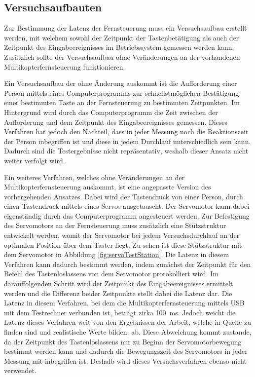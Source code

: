\subsection{Versuchsaufbauten}
Zur Bestimmung der Latenz der Fernsteuerung muss ein Versuchsaufbau erstellt werden, mit welchem sowohl der Zeitpunkt der Tastenbetätigung als auch der Zeitpunkt des Eingabeereignisses im Betriebssystem gemessen werden kann. Zusätzlich sollte der Versuchsaufbau ohne Veränderungen an der vorhandenen Multikopterfernsteuerung funktionieren.

Ein Versuchsaufbau der ohne Änderung auskommt ist die Aufforderung einer Person mittels eines Computerprogramms zur schnellstmöglichen Bestätigung einer bestimmten Taste an der Fernsteuerung zu bestimmten Zeitpunkten. Im Hintergrund wird durch das Computerprogramm die Zeit zwischen der Aufforderung und dem Zeitpunkt des Eingabeereignisses gemessen. Dieses Verfahren hat jedoch den Nachteil, dass in jeder Messung noch die Reaktionszeit der Person inbegriffen ist und diese in jedem Durchlauf unterschiedlich sein kann. Dadurch sind die Testergebnisse nicht repräsentativ, weshalb dieser Ansatz nicht weiter verfolgt wird.

Ein weiteres Verfahren, welches ohne Veränderungen an der Multikopterfernsteuerung auskommt, ist eine angepasste Version des vorhergehenden Ansatzes. Dabei wird der Tastendruck von einer Person, durch einen Tastendruck mittels eines Servos ausgetauscht. Der Servomotor kann dabei eigenständig durch das Computerprogramm angesteuert werden. Zur Befestigung des Servomotors an der Fernsteuerung muss zusätzlich eine Stützstruktur entwickelt werden, womit der Servomotor bei jedem Versuchsdurchlauf an der optimalen Position über dem Taster liegt. Zu sehen ist diese Stützstruktur mit dem Servomotor in Abbildung \ref{fig:servoTestStation}. Die Latenz in diesem Verfahren kann dadurch bestimmt werden, indem zunächst der Zeitpunkt für den Befehl des Tastenloslassens von dem Servomotor protokolliert wird. Im darauffolgenden Schritt wird der Zeitpunkt des Eingabeereignisses ermittelt werden und die Differenz beider Zeitpunkte stellt dabei die Latenz dar. Die Latenz in diesem Verfahren, bei dem die Multikopterfernsteuerung mittels USB mit dem Testrechner verbunden ist, beträgt zirka 100~ms. Jedoch weicht die Latenz dieses Verfahren weit von den Ergebnissen der Arbeit, welche in Quelle \cite{wimmerLatenzStation} zu finden sind und realistische Werte bilden, ab. Diese Abweichung kommt zustande, da der Zeitpunkt des Tastenloslassens nur zu Beginn der Servomotorbewegung bestimmt werden kann und dadurch die Bewegungszeit des Servomotors in jeder Messung mit inbegriffen ist. Deshalb wird dieses Versuchsverfahren ebenso nicht verwendet.

